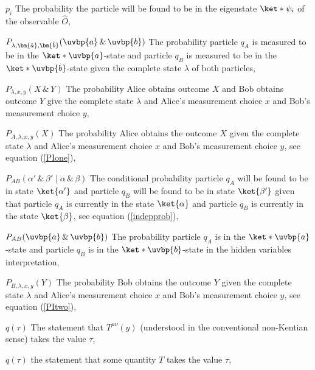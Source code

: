 \begin{thenomenclature}
      \item [{$p_i$}]\begingroup The probability the particle will be found to be in the eigenstate $\ket*{\psi_i}$ of the observable $\hat{O}$, \nomrefpage{}
      \item [{$P_{\lambda,\bm{\hat{a}},\bm{\hat{b}}}(\uvbp{a}\,\&\,\uvbp{b})$}]\begingroup The probability particle $q_A$ is measured to be in the $\ket*{\uvbp{a}}$-state and particle $q_B$ is measured to be in the $\ket*{\uvbp{b}}$-state given the complete state $\lambda$ of both particles, \nomrefpage{}
      \item [{$P_{\lambda,x,y}(X \,\&\, Y)$}]\begingroup The probability  Alice obtains outcome $X$ and Bob obtains outcome $Y$ give the complete state $\lambda$ and Alice's measurement choice $x$ and Bob's measurement choice $y$, \nomrefpage{}
      \item [{$P_{A, \lambda,x,y}(X)$}]\begingroup The probability Alice obtains the outcome $X$ given the complete state $\lambda$ and Alice's measurement choice $x$ and Bob's measurement choice $y$, see equation (\ref{PIone}), \nomrefpage{}
      \item [{$P_{AB}(\alpha'\,\&\,\beta'\mid\alpha\,\&\,\beta)$}]\begingroup The conditional probability particle $q_A$ will be found to be in state $\ket{\alpha'}$ and particle $q_B$ will be found to be in state $\ket{\beta'}$ given that particle $q_A$ is currently in the state $\ket{\alpha}$ and particle $q_B$ is currently in the state $\ket{\beta}$, see equation (\ref{indepprob}), \nomrefpage{}
      \item [{$P_{AB}(\uvbp{a}\,\&\,\uvbp{b})$}]\begingroup The probability particle $q_A$ is in the $\ket*{\uvbp{a}}$-state and particle $q_B$ is in the $\ket*{\uvbp{b}}$-state in the hidden variables interpretation, \nomrefpage{}
      \item [{$P_{B, \lambda,x,y}(Y)$}]\begingroup The probability Bob obtains the outcome $Y$ given the complete state $\lambda$ and Alice's measurement choice $x$ and Bob's measurement choice $y$, see equation (\ref{PItwo}), \nomrefpage{}
      \item [{$q(\tau)$}]\begingroup The statement that $T^{\mu\nu}(y)$ (understood in the conventional non-Kentian sense) takes the value $\tau$, \nomrefpage{}
      \item [{$q(\tau)$}]\begingroup the statement that some quantity $T$  takes the value $\tau$, \nomrefpage{}

\end{thenomenclature}
